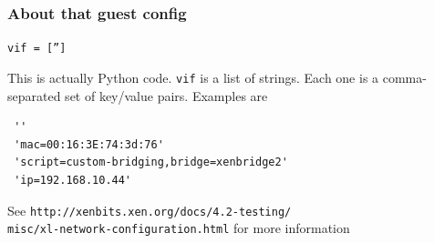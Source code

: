 \documentclass[10pt]{beamer}
\begin{document}
\begin{frame}[fragile]
  \frametitle{About that guest config}
  
  
   
   \texttt{vif = ['']}
  
  \vspace{5mm}
This is actually Python code. \texttt{vif} is a list of strings. Each one is a comma-separated  set of
key/value pairs. Examples are

\begin{verbatim}
 ''
 'mac=00:16:3E:74:3d:76'
 'script=custom-bridging,bridge=xenbridge2'
 'ip=192.168.10.44'
\end{verbatim}

See \texttt{http://xenbits.xen.org/docs/4.2-testing/ \\ misc/xl-network-configuration.html} for more information


\end{frame}
\end{document}
